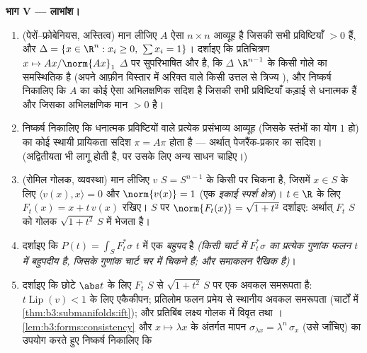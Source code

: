 \begin{problem}[{सप्ताहांत समस्या --- कोई प्रत्याकर्षण नहीं, कोई
पलायन नहीं}]
\medskip
\noindent\textbf{भाग V --- लाभांश।}
\begin{enumerate}[resume]
  \item (पेरों--फ्रोबेनियस, अस्तित्व) मान लीजिए $A$ ऐसा $n\times n$
        आव्यूह है जिसकी सभी प्रविष्टियाँ $> 0$ हैं, और $\Delta = \{x \in \R^n : x_i \geq 0,\ \sum x_i =
        1\}$।
        दर्शाइए कि प्रतिचित्रण $x \mapsto Ax/\norm{Ax}_1$ $\Delta$ पर सुपरिभाषित और 
        है, कि $\Delta$ $\R^{n-1}$ के किसी  गोले का समस्थितिक है
        (अपने आफ़ीन विस्तार में अरिक्त  वाले किसी उत्तल
         से त्रिज्य ), और निष्कर्ष निकालिए कि
        $A$ का कोई ऐसा अभिलक्षणिक सदिश है जिसकी सभी प्रविष्टियाँ
        कड़ाई से धनात्मक हैं और जिसका अभिलक्षणिक मान $> 0$ है।
  \item निष्कर्ष निकालिए कि धनात्मक प्रविष्टियों वाले प्रत्येक
        प्रसंभाव्य आव्यूह (जिसके स्तंभों का योग $1$ हो) का कोई
        स्थायी प्रायिकता सदिश $\pi = A\pi$ होता है --- अर्थात्
        पेजरैंक-प्रकार का सदिश। (अद्वितीयता भी लागू होती है, पर
        उसके लिए अन्य साधन चाहिए।)
  \item (रोमिल गोलक, व्यवस्था) मान लीजिए $v$ $S = S^{n-1}$ के किसी
         पर चिकना है, जिसमें $x \in S$ के लिए $\langle v(x),
        x\rangle = 0$ और $\norm{v(x)} = 1$
        (एक \emph{इकाई स्पर्श क्षेत्र})। $t \in \R$ के लिए $F_t(x) = x + t\,v(x)$
        रखिए। $S$ पर $\norm{F_t(x)} = \sqrt{1 + t^2}$ दर्शाइए: अर्थात् $F_t$ $S$ को
        गोलक $\sqrt{1+t^2}\,S$ में भेजता है।
  \item दर्शाइए कि $P(t) = \int_SF_t^*\sigma$ $t$ में एक \emph{बहुपद} है \emph{(किसी
        चार्ट में $F_t^*\sigma$ का प्रत्येक गुणांक फलन $t$ में बहुपदीय
        है, जिसके गुणांक चार्ट चर में चिकने हैं; और समाकलन रैखिक
        है)}।
  \item दर्शाइए कि छोटे $\abs t$ के लिए $F_t$ $S$ से $\sqrt{1+t^2}\,S$ पर एक
        अवकल समरूपता है: $t\operatorname{Lip}(v) < 1$ के लिए एकैकीपन; प्रतिलोम फलन
        प्रमेय से स्थानीय अवकल समरूपता (चार्टों में \cref{thm:b3:submanifolds:ift}); और
        प्रतिबिंब  लक्ष्य गोलक में विवृत तथा । \cref{lem:b3:forms:consistency}
        और $x \mapsto \lambda x$ के अंतर्गत मापन $\sigma_{\lambda x} =
        \lambda^{n}\,\sigma_x$ (उसे जाँचिए) का उपयोग करते
        हुए निष्कर्ष निकालिए कि

\end{enumerate}
\end{problem}
